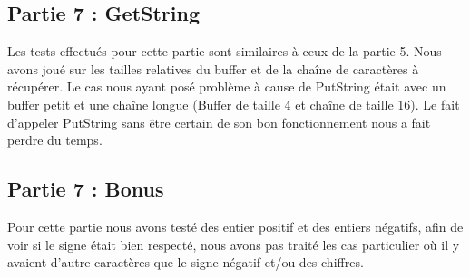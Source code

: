 \documentclass[a4paper]{article}
\begin{document}
\subsection{Partie 7 : GetString}

Les tests effectués pour cette partie sont similaires à ceux de la partie 5. Nous
avons joué sur les tailles relatives du buffer et de la chaîne de caractères à
récupérer. Le cas nous ayant posé problème à cause de PutString était avec un buffer
petit et une chaîne longue (Buffer de taille 4 et chaîne de taille 16). Le fait
d'appeler PutString sans être certain de son bon fonctionnement nous a fait perdre
du temps.

\subsection{Partie 7 : Bonus}

Pour cette partie nous avons testé des entier positif et des entiers négatifs, afin
de voir si le signe était bien respecté, nous avons pas traité les cas particulier
où il y avaient d'autre caractères que le signe négatif et/ou des chiffres.

\end{document}
